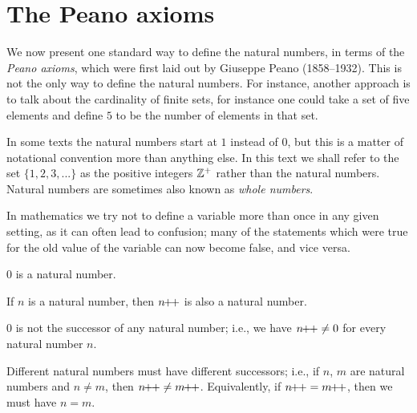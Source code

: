 \section{The Peano axioms}\label{sec:2.1}

\begin{note}
  We now present one standard way to define the natural numbers, in terms of the \emph{Peano axioms}, which were first laid out by Giuseppe Peano (1858--1932).
  This is not the only way to define the natural numbers.
  For instance, another approach is to talk about the cardinality of finite sets, for instance one could take a set of five elements and define \(5\) to be the number of elements in that set.
\end{note}

\begin{note}
  In some texts the natural numbers start at \(1\) instead of \(0\), but this is a matter of notational convention more than anything else.
  In this text we shall refer to the set \(\{1, 2, 3,...\}\) as the positive integers \(\mathbb{Z}^+\) rather than the natural numbers.
  Natural numbers are sometimes also known as \emph{whole numbers}.
\end{note}

\begin{note}
  In mathematics we try not to define a variable more than once in any given setting, as it can often lead to confusion;
  many of the statements which were true for the old value of the variable can now become false, and vice versa.
\end{note}

\begin{ax}\label{2.1}
  \(0\) is a natural number.
\end{ax}

\begin{ax}\label{2.2}
  If \(n\) is a natural number, then \(n\!\!+\!\!+\) is also a natural number.
\end{ax}

\begin{ax}\label{2.3}
  \(0\) is not the successor of any natural number;
  i.e., we have \(n\!\!+\!\!+ \neq 0\) for every natural number \(n\).
\end{ax}

\begin{ax}\label{2.4}
  Different natural numbers must have different successors;
  i.e., if \(n\), \(m\) are natural numbers and \(n \neq m\), then \(n\pp \neq m\pp\).
  Equivalently, if \(n\pp = m\pp\), then we must have \(n = m\).
\end{ax}

